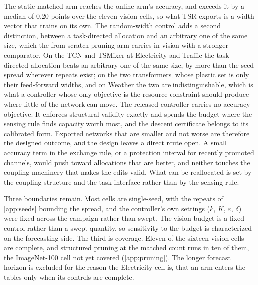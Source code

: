 \documentclass[10pt]{article}
\theoremstyle{paper}
\begin{document}
The static-matched arm reaches the online arm's accuracy, and exceeds it by a median of $0.20$ points over the eleven vision cells, so what TSR exports is a width vector that trains on its own. The random-width control adds a second distinction, between a task-directed allocation and an arbitrary one of the same size, which the from-scratch pruning arm carries in vision with a stronger comparator. On the TCN and TSMixer at Electricity and Traffic the task-directed allocation beats an arbitrary one of the same size, by more than the seed spread wherever repeats exist; on the two transformers, whose plastic set is only their feed-forward widths, and on Weather the two are indistinguishable, which is what a controller whose only objective is the resource constraint should produce where little of the network can move. The released controller carries no accuracy objective. It enforces structural validity exactly and spends the budget where the sensing rule finds capacity worth most, and the descent certificate belongs to its calibrated form. Exported networks that are smaller and not worse are therefore the designed outcome, and the design leaves a direct route open. A small accuracy term in the exchange rule, or a protection interval for recently promoted channels, would push toward allocations that are better, and neither touches the coupling machinery that makes the edits valid. What can be reallocated is set by the coupling structure and the task interface rather than by the sensing rule.

Three boundaries remain. Most cells are single-seed, with the repeats of \cref{app:seeds} bounding the spread, and the controller's own settings ($k$, $K$, $\varepsilon$, $\delta$) were fixed across the campaign rather than swept. The vision budget is a fixed control rather than a swept quantity, so sensitivity to the budget is characterized on the forecasting side. The third is coverage. Eleven of the sixteen vision cells are complete, and structured pruning at the matched count runs in ten of them, the ImageNet-100 cell not yet covered (\cref{app:pruning}). The longer forecast horizon is excluded for the reason the Electricity cell is, that an arm enters the tables only when its controls are complete.
\end{document}

